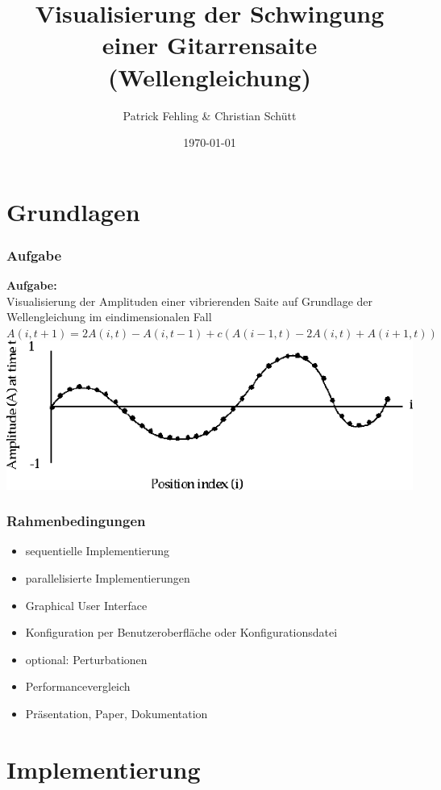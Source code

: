 \documentclass[xcolor=dvipsnames]{beamer}
\title{Visualisierung der Schwingung einer Gitarrensaite (Wellengleichung)}
\author{Patrick Fehling \& Christian Schütt}
\date{\today}
\begin{document}
\maketitle
\frame{\tableofcontents}

\section{Grundlagen}
\begin{frame}\frametitle{Aufgabe}
		\textbf{Aufgabe:}\\
		Visualisierung der Amplituden einer vibrierenden Saite auf Grundlage der Wellengleichung im eindimensionalen Fall\\
		\vspace{1ex}
		$A(i, t + 1) = 2A(i, t) - A(i, t - 1) + c(A(i - 1, t) - 2A(i, t) + A(i + 1, t))$\\
		\vspace{2ex}
		\includegraphics[width=1.0\textwidth,valign=t]{pictures/wellengleichung_aufgabe}
\end{frame}

\begin{frame}\frametitle{Rahmenbedingungen}
	\begin{itemize}
		\item sequentielle Implementierung
		\item parallelisierte Implementierungen
		\item Graphical User Interface
		\item Konfiguration per Benutzeroberfläche oder Konfigurationsdatei
		\item optional: Perturbationen
		\vspace{3ex}
		\item Performancevergleich
		\item Präsentation, Paper, Dokumentation
	\end{itemize}
\end{frame}

\section{Implementierung}
\frame{\tableofcontents[current]}
\end{document}
